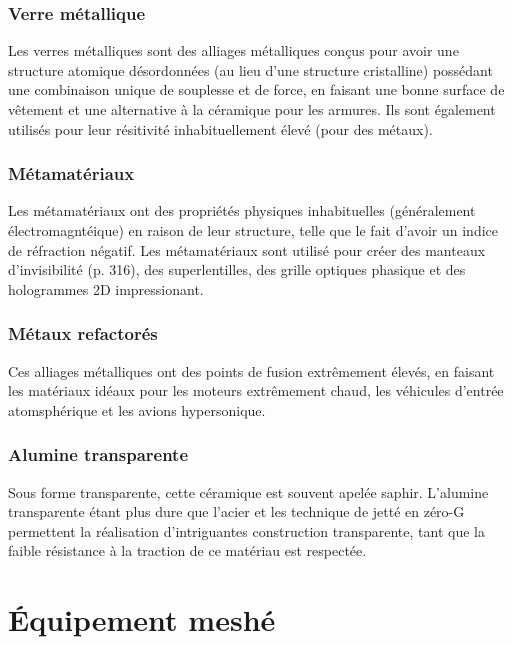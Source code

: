 \subsubsection{Verre métallique} 

Les verres métalliques sont des alliages métalliques conçus pour avoir une structure atomique désordonnées (au lieu d'une structure cristalline) possédant une combinaison unique de souplesse et de force, en faisant une bonne surface de vêtement et une alternative à la céramique pour les armures. Ils sont également utilisés pour leur résitivité inhabituellement élevé (pour des métaux). 

\subsubsection{Métamatériaux} 

Les métamatériaux ont des propriétés physiques inhabituelles (généralement électromagntéique) en raison de leur structure, telle que le fait d'avoir un indice de réfraction négatif. Les métamatériaux sont utilisé pour créer des manteaux d'invisibilité (p. 316), des superlentilles, des grille optiques phasique et des hologrammes 2D impressionant. 

\subsubsection{Métaux refactorés} 

Ces alliages métalliques ont  des points de fusion extrêmement élevés, en faisant les matériaux idéaux pour les moteurs extrêmement chaud, les véhicules d'entrée atomsphérique et les avions hypersonique. 

\subsubsection{Alumine transparente} 

Sous forme transparente, cette céramique est souvent apelée saphir. L'alumine transparente étant plus dure que l'acier et les technique de jetté en zéro-G permettent la réalisation d'intriguantes construction transparente, tant que la faible résistance à la traction de ce matériau est respectée. 



\section{Équipement meshé} \label{sec:meshed-gear} 

